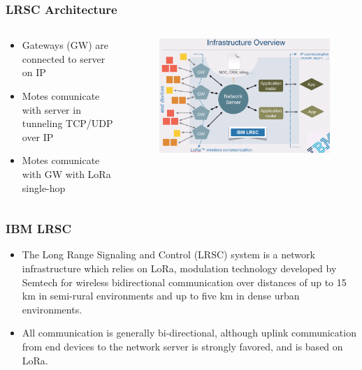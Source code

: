 \begin{frame}[fragile]
  \frametitle{LRSC Architecture}
  \begin{columns}
    \begin{column}{.48\linewidth}
    	\begin{itemize}
	  \item Gateways (GW) are connected to server on IP
	  \item Motes comunicate with server in tunneling TCP/UDP over IP
	  \item Motes comunicate with GW with LoRa single-hop
    	\end{itemize}
    \end{column}
    \hfill
    \begin{column}{.48\linewidth}
    	\begin{figure}
	  \centering
	  \includegraphics[width=\linewidth]{img/LRSC_infrastructure.png}
    	\end{figure}

    \end{column}
  \end{columns}
\end{frame}

\begin{frame}[fragile]
  \frametitle{IBM LRSC}
    	\begin{itemize}
	  \item The Long Range Signaling and Control (LRSC) system is a network infrastructure which relies on LoRa\texttrademark, modulation technology developed by Semtech for wireless bidirectional communication over distances of up to 15 km in semi-rural environments and up to five km in dense urban environments.
	  \item All communication is generally bi-directional, although uplink communication from end devices to the network server is strongly favored, and is based on LoRa.
    	\end{itemize}
   
\end{frame}


